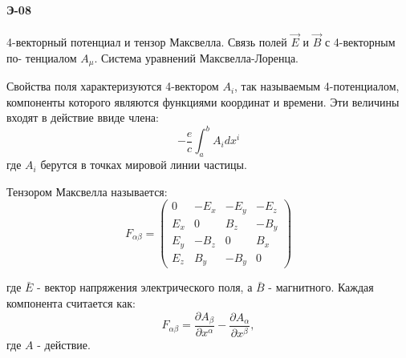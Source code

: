 \documentclass[__main__.tex]{subfiles}
\begin{document}
\paragraph{Э-08}
4-векторный потенциал и тензор Максвелла. Связь полей $\vec{E}$ и $\vec{B}$ с 4-векторным по-
тенциалом $A_μ$. Система уравнений Максвелла-Лоренца.\



\begin{definition}
	Свойства поля характеризуются 4-вектором $A_i$, так называемым 4-потенциалом, компоненты которого являются функциями координат и времени. Эти величины входят в действие ввиде члена:
	$$-\frac{e}{c}\int_{a}^{b}A_idx^i$$
	где $A_i$ берутся в точках мировой линии частицы. 
\end{definition}

\begin{definition}
	Тензором Максвелла называется: 
	$$F_{\alpha\beta}=
	\begin{pmatrix}
	0 & -E_x & -E_y & -E_z\\
	E_x & 0 & B_z & -B_y\\
	E_y & -B_z & 0 & B_x\\
	E_z & B_y & -B_y & 0
	\end{pmatrix}$$
\end{definition}

где $\bar E$ - вектор напряжения электрического поля, а $\bar B$ - магнитного.
Каждая компонента считается как:
$$
F_{\alpha\beta}=\frac{\partial A_\beta}{\partial x^{\alpha}}
-\frac{\partial A_\alpha}{\partial x^{\beta}},
$$
где $A$ - действие.
\end{document}
